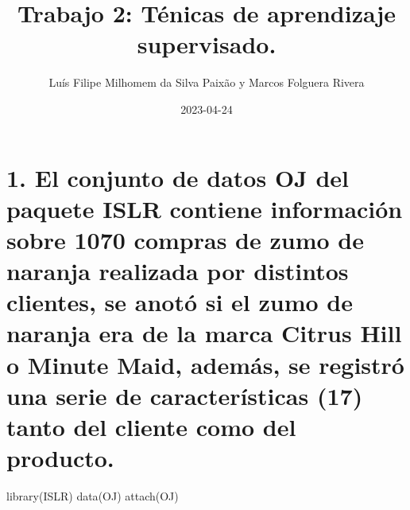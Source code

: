 \documentclass[
]{article}
\title{Trabajo 2: Ténicas de aprendizaje supervisado.}
\author{Luís Filipe Milhomem da Silva Paixão y Marcos Folguera Rivera}
\date{2023-04-24}
\newenvironment{Shaded}{\begin{snugshade}}{\end{snugshade}}
\newcommand{\FunctionTok}[1]{\textcolor[rgb]{0.00,0.00,0.00}{#1}}
\newcommand{\NormalTok}[1]{#1}
\begin{document}
\maketitle

{
\setcounter{tocdepth}{3}
\tableofcontents
}
\hypertarget{el-conjunto-de-datos-oj-del-paquete-islr-contiene-informaciuxf3n-sobre-1070-compras-de-zumo-de-naranja-realizada-por-distintos-clientes-se-anotuxf3-si-el-zumo-de-naranja-era-de-la-marca-citrus-hill-o-minute-maid-ademuxe1s-se-registruxf3-una-serie-de-caracteruxedsticas-17-tanto-del-cliente-como-del-producto.}{%
\section{1. El conjunto de datos OJ del paquete ISLR contiene
información sobre 1070 compras de zumo de naranja realizada por
distintos clientes, se anotó si el zumo de naranja era de la marca
Citrus Hill o Minute Maid, además, se registró una serie de
características (17) tanto del cliente como del
producto.}\label{el-conjunto-de-datos-oj-del-paquete-islr-contiene-informaciuxf3n-sobre-1070-compras-de-zumo-de-naranja-realizada-por-distintos-clientes-se-anotuxf3-si-el-zumo-de-naranja-era-de-la-marca-citrus-hill-o-minute-maid-ademuxe1s-se-registruxf3-una-serie-de-caracteruxedsticas-17-tanto-del-cliente-como-del-producto.}}

\begin{Shaded}
\begin{Highlighting}[]
\FunctionTok{library}\NormalTok{(ISLR)}
\FunctionTok{data}\NormalTok{(OJ)}
\FunctionTok{attach}\NormalTok{(OJ)}
\end{Highlighting}
\end{Shaded}
\end{document}
